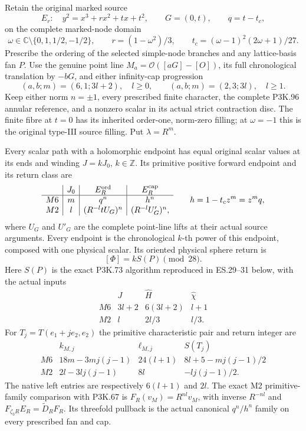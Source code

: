\begin{theorem}\label{night:P3K.115}
Retain the original marked source
\[
 E_r:\quad y^2=x^3+rx^2+tx+t^2,\qquad G=(0,t),
 \qquad q=t-t_c,
\]
on the complete marked-node domain
\[
 \omega\in\mathbb C\setminus\{0,1,1/2,-1/2\},\qquad
 r=(1-\omega^2)/3,\qquad
 t_c=(\omega-1)^2(2\omega+1)/27.
\]
Prescribe the ordering of the selected simple-node branches and
any lattice-basis fan \(P\). Use the genuine point line
\(M_a=\mathcal O([aG]-[O])\), its full chronological translation
by \(-bG\), and either infinity-cap progression
\[
 (a,b;m)=(6,1;3l+2),\quad l\ge0,
 \qquad (a,b;m)=(2,3;3l),\quad l\ge1.
\]
Keep either norm \(n=\pm1\), every prescribed finite character,
the complete P3K.96 annular reference, and a nonzero scalar in its
actual strict contraction disc. The finite fibre at \(t=0\)
has its inherited order-one, norm-zero filling; at \(\omega=-1\)
this is the original type-III source filling. Put \(\lambda=R^m\).

Every scalar path with a holomorphic endpoint has equal original
scalar values at its ends and winding \(J=kJ_0\), \(k\in\mathbb Z\).
Its primitive positive forward endpoint and its return class are
\[
 \begin{array}{c|c|c|c}
 &J_0&E_R^{\rm ord}&E_R^{\rm cap}\\\hline
 M6&m&q^n&h^n\\
 M2&l&(R^{-l}tU_G)^n&(R^{-l}U'_G)^n,
 \end{array}
 \qquad h=1-t_cz^m=z^mq,
\]
where \(U_G\) and \(U'_G\) are the complete point-line lifts
at their actual source arguments. Every endpoint is the chronological
\(k\)-th power of this endpoint, composed with one physical scalar.
Its oriented physical sphere return is
\[
                         [\Phi]=kS(P)\pmod {28}.
\]
Here \(S(P)\) is the exact P3K.73 algorithm reproduced in
ES.29--31 below, with the actual inputs
\[
 \begin{array}{c|c|c|c}
 &J&\widehat H&\widehat\chi\\\hline
 M6&3l+2&6(3l+2)&l+1\\
 M2&l&2l/3&l/3.
 \end{array}
\]
For \(T_j=T(e_1+je_2,e_2)\) the primitive characteristic
pair and return integer are
\[
 \begin{array}{c|c|c|c}
 &k_{M,j}&\ell_{M,j}&S(T_j)\\\hline
 M6&18m-3mj(j-1)&24(l+1)&8l+5-mj(j-1)/2\\
 M2&2l-3lj(j-1)&8l&-lj(j-1)/2.
 \end{array}
\]
The native left entries are respectively \(6(l+1)\) and \(2l\).
The exact M2 primitive-family comparison with P3K.67 is
\(F_R(v_M)=R^{nl}v_M\), with inverse \(R^{-nl}\) and
\(F_{\zeta_3R}E_R=\widetilde D_RF_R\). Its threefold pullback
is the actual canonical \(q^n/h^n\) family on every prescribed
fan and cap.


\end{theorem}
